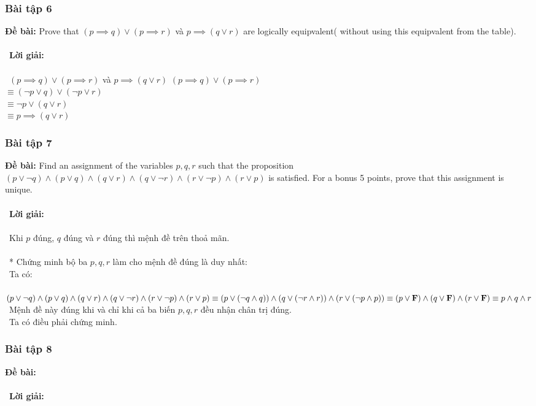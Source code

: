 \documentclass[a4paper]{article}
\begin{document}
\subsubsection{Bài tập 6}
\textbf{Đề bài:} Prove that $(p \implies q) \lor (p \implies r)$ và $p \implies (q \lor r)$ are logically equipvalent( without using this equipvalent from the table).
\\\ \\\
\textbf{Lời giải:} \\\ \\\
$(p \implies q) \lor (p \implies r)$ và $p \implies (q \lor r)$
$(p \implies q) \lor (p \implies r)$\\
$\equiv (\lnot p \lor q) \lor (\lnot p \lor r)$\\
$\equiv \lnot p \lor (q \lor r)$\\
$\equiv p \implies (q \lor r)$\\
\clearpage
\subsubsection{Bài tập 7}
\textbf{Đề bài: }Find an assignment of the variables $p, q, r$ such that the proposition $(p \lor \lnot q) \land (p \lor q) \land (q \lor r) \land (q \lor \lnot r) \land (r \lor \lnot p) \land (r \lor p)$ is satisfied. For a bonus 5 points, prove that this assignment is unique. \\\ \\\
\textbf{Lời giải:} \\\ \\\
Khi $p$ đúng, $q$ đúng và $r$ đúng thì mệnh đề trên thoả mãn. \\\ \\\
* Chứng minh bộ ba $p,q,r$ làm cho mệnh đề đúng là duy nhất: \\\
Ta có: \\\
$(p \lor \lnot q) \land (p \lor q) \land (q \lor r) \land (q \lor \lnot r) \land (r \lor \lnot p) \land (r \lor p) \\\equiv  (p \lor (\lnot q \land q)) \land (q \lor (\lnot r \land r)) \land (r \lor (\lnot p \land p))\\\equiv (p \lor \textbf{F}) \land (q \lor \textbf{F}) \land (r \lor \textbf{F}) \\\equiv p \land q \land r$ \\\
Mệnh đề này đúng khi và chỉ khi cả ba biến $p,q,r$ đều nhận chân trị đúng. \\\
Ta có điều phải chứng minh.
\clearpage
\subsubsection{Bài tập 8}
\textbf{Đề bài:} 
\\\ \\\
\textbf{Lời giải:} \\\ \\\
\clearpage
\end{document}
